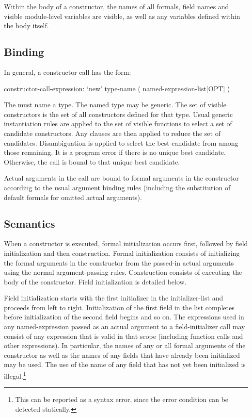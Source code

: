 Within the body of a constructor, the names of all formals, field names and visible
module-level variables are visible, as well as any variables defined within the body
itself.


\subsection{Binding}

In general, a constructor call has the form:
\begin{syntax}
constructor-call-expression:
  `new' type-name ( named-expression-list[OPT] )
\end{syntax}
The  must name a type.  The named type may be generic.
The set of visible constructors is the set of all constructors defined for that type.  Usual
generic instantiation rules are applied to the set of visible functions to select a set of
candidate constructors.  Any  clauses are then applied to reduce the set of
candidates.  Disambiguation is applied to select the best candidate from among those
remaining.  It is a program error if there is no unique best candidate.  Otherwise, the
call is bound to that unique best candidate.

Actual arguments in the call are bound to formal arguments in the constructor according to
the usual argument binding rules (including the substitution of default formals for
omitted actual arguments).

\subsection{Semantics}
\label{Constructor_Semantics}

When a constructor is executed, formal initialization occurs first, followed by field
initialization and then construction.  Formal initialization consists of initializing the
formal arguments in the constructor from the passed-in actual arguments using the normal
argument-passing rules.  Construction consists of executing the body of the
constructor.  Field initialization is detailed below.

Field initialization starts with the first initializer in the initializer-list and
proceeds from left to right.  Initialization of the first field in the list completes
before initialization of the second field begins and so on.  The expressions used in any
named-expression passed as an actual argument to a field-initializer call may consist of
any expression that is valid in that scope (including function calls and other
expressions).  In particular, the names of any or all formal arguments of the constructor
as well as the names of any fields that have already been initialized may be used.  The
use of the name of any field that has not yet been initialized is illegal.\footnote{This
  can be reported as a syntax error, since the error condition can be detected
  statically.}

